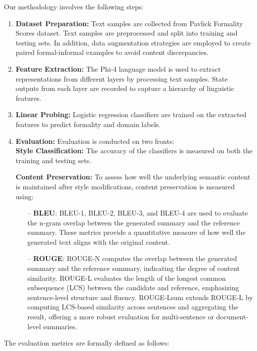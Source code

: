\documentclass[twocolumn]{article}
\begin{document}
Our methodology involves the following steps:
\begin{enumerate}
    \item \textbf{Dataset Preparation:} Text samples are collected from Pavlick Formality Scores dataset. Text samples are preprocessed and split into training and testing sets. In addition, data augmentation strategies are employed to create paired formal-informal examples to avoid content discrepancies.
    \item \textbf{Feature Extraction:} The Phi-4 language model is used to extract representations from different layers by processing text samples. State outputs from each layer are recorded to capture a hierarchy of linguistic features.
    \item \textbf{Linear Probing:} Logistic regression classifiers are trained on the extracted features to predict formality and domain labels.
    \item \textbf{Evaluation:}     Evaluation is conducted on two fronts:\\
    \textbf{Style Classification:}
        The accuracy of the classifiers is measured on both the training and testing sets.

    \textbf{Content Preservation:}
        To assess how well the underlying semantic content is maintained after style modifications, content preservation is measured using:
        \begin{itemize}
            \item[--] \textbf{BLEU}: BLEU-1, BLEU-2, BLEU-3, and BLEU-4 are used to evaluate the n-gram overlap between the generated summary and the reference summary. These metrics provide a quantitative measure of how well the generated text aligns with the original content.
            \item[--] \textbf{ROUGE}: ROUGE-N computes the overlap between the generated summary and the reference summary, indicating the degree of content similarity. ROUGE-L evaluates the length of the longest common subsequence (LCS) between the candidate and reference, emphasizing sentence-level structure and fluency. ROUGE-Lsum extends ROUGE-L by computing LCS-based similarity across sentences and aggregating the result, offering a more robust evaluation for multi-sentence or document-level summaries.
        \end{itemize}
\end{enumerate}

The evaluation metrics are formally defined as follows:
\end{document}
